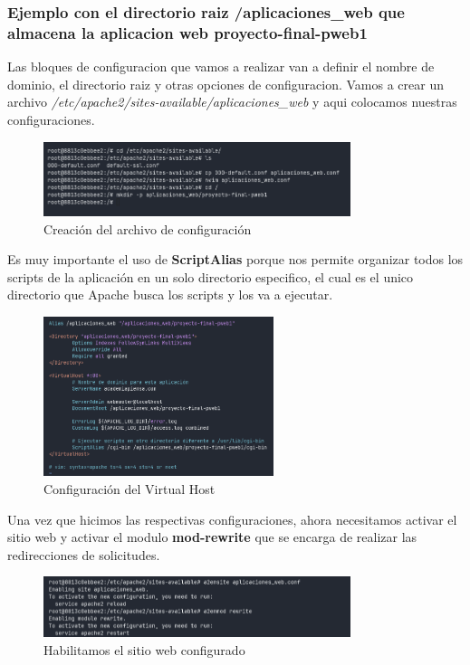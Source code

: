 \subsubsection{Ejemplo con el directorio raiz /aplicaciones\_web que almacena la aplicacion web proyecto-final-pweb1}

Las bloques de configuracion que vamos a realizar van a definir el nombre de dominio, el directorio raiz y 
otras opciones de configuracion. Vamos a crear un archivo \textit{/etc/apache2/sites-available/aplicaciones\_web} y aqui colocamos nuestras configuraciones.

\begin{figure}[H]
  \centering
  \includegraphics[width=0.8\textwidth]{img/directories.png}
  \caption{Creación del archivo de configuración}
\end{figure}

Es muy importante el uso de \textbf{ScriptAlias} porque nos permite organizar todos los scripts de la aplicación en un solo directorio especifico, el cual es el unico directorio que Apache busca los scripts y los va a ejecutar.

\begin{figure}[H]
  \centering
  \includegraphics[width=0.6\textwidth]{img/conf.png}
  \caption{Configuración del Virtual Host}
\end{figure}

Una vez que hicimos las respectivas configuraciones, ahora necesitamos activar el sitio web y activar el modulo \textbf{mod-rewrite} que se encarga de realizar las redirecciones de solicitudes.

\begin{figure}[H]
  \centering
  \includegraphics[width=0.8\textwidth]{img/enable_conf.png}
  \caption{Habilitamos el sitio web configurado}
\end{figure}

